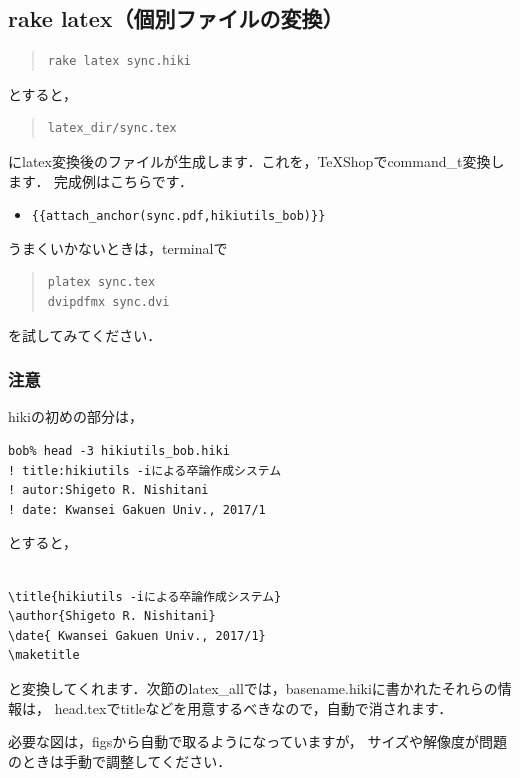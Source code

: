 \subsection{rake latex（個別ファイルの変換）}\begin{quote}\begin{verbatim}
rake latex sync.hiki
\end{verbatim}\end{quote}
とすると，
\begin{quote}\begin{verbatim}
latex_dir/sync.tex
\end{verbatim}\end{quote}
にlatex変換後のファイルが生成します．これを，TeXShopでcommand\_t変換します．
完成例はこちらです．

\begin{itemize}
\item \verb|{{attach_anchor(sync.pdf,hikiutils_bob)}}|
\end{itemize}
うまくいかないときは，terminalで
\begin{quote}\begin{verbatim}
platex sync.tex
dvipdfmx sync.dvi
\end{verbatim}\end{quote}
を試してみてください．

\subsubsection{注意}
hikiの初めの部分は，
\begin{lstlisting}[style=customCsh,basicstyle={\scriptsize\ttfamily}]
bob% head -3 hikiutils_bob.hiki
! title:hikiutils -iによる卒論作成システム
! autor:Shigeto R. Nishitani
! date: Kwansei Gakuen Univ., 2017/1
\end{lstlisting}
とすると，
\begin{lstlisting}[style=customTeX,basicstyle={\scriptsize\ttfamily}]

\title{hikiutils -iによる卒論作成システム}
\author{Shigeto R. Nishitani}
\date{ Kwansei Gakuen Univ., 2017/1}
\maketitle
\end{lstlisting}
と変換してくれます．次節のlatex\_allでは，basename.hikiに書かれたそれらの情報は，
head.texでtitleなどを用意するべきなので，自動で消されます．

必要な図は，figsから自動で取るようになっていますが，
サイズや解像度が問題のときは手動で調整してください．

